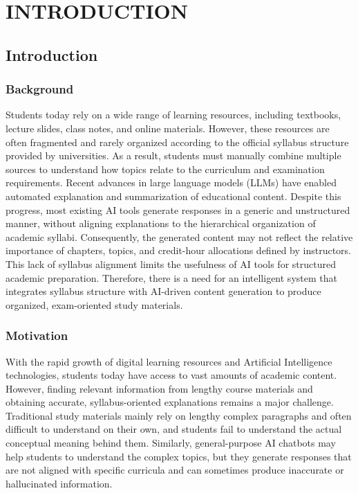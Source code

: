 \chapter{INTRODUCTION}

\section{Introduction}
\subsection*{Background}

Students today rely on a wide range of learning resources, including textbooks, lecture slides, class notes, and online materials. However, these resources are often fragmented and rarely organized according to the official syllabus structure provided by universities. As a result, students must manually combine multiple sources to understand how topics relate to the curriculum and examination requirements.
Recent advances in large language models (LLMs) have enabled automated explanation and summarization of educational content. Despite this progress, most existing AI tools generate responses in a generic and unstructured manner, without aligning explanations to the hierarchical organization of academic syllabi. Consequently, the generated content may not reflect the relative importance of chapters, topics, and credit-hour allocations defined by instructors.
This lack of syllabus alignment limits the usefulness of AI tools for structured academic preparation. Therefore, there is a need for an intelligent system that integrates syllabus structure with AI-driven content generation to produce organized, exam-oriented study materials.

\subsection*{Motivation}

With the rapid growth of digital learning resources and Artificial Intelligence technologies, students today have access to vast amounts of academic content. However, finding relevant information from lengthy course materials and obtaining accurate, syllabus-oriented explanations remains a major challenge. Traditional study materials mainly rely on lengthy complex paragraphs and often difficult to understand on their own, and students fail to understand the actual conceptual meaning behind them. Similarly, general-purpose AI chatbots may help students to understand the complex topics, but they generate responses that are not aligned with specific curricula and can sometimes produce inaccurate or hallucinated information. \par

